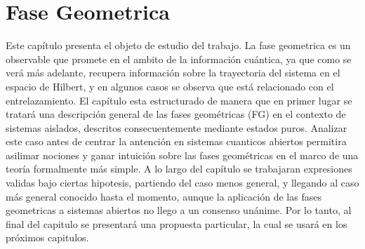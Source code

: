 \chapter{Fase Geometrica}
\label{ch:fg}

\pagestyle{fancy}
\fancyhf{}
\fancyhead[LE]{\nouppercase{\rightmark\hfill}}
\fancyhead[RO]{\nouppercase{\leftmark\hfill}}
\fancyfoot[LE,RO]{\hfill\thepage\hfill}

Este cap\'itulo presenta el objeto de estudio del trabajo. La fase geometrica es un observable que promete en el ambito de la informaci\'on cu\'antica, ya que como se ver\'a m\'as adelante, recupera informaci\'on sobre la trayectoria del sistema en el espacio de Hilbert, y en algunos casos se observa que est\'a relacionado con el entrelazamiento. 
El cap\'itulo esta estructurado de manera que en primer lugar se tratar\'a una descripción general de las fases geom\'etricas (FG) en el contexto de sistemas aislados, descritos consecuentemente mediante estados puros. Analizar este caso antes de centrar la antención en sistemas cuanticos abiertos permitira asilimar nociones y ganar intuición sobre las fases geométricas en el marco de una teoría formalmente más simple. A lo largo del capítulo se trabajaran expresiones validas bajo ciertas hipotesis, partiendo del caso menos general, y llegando al caso más general conocido hasta el momento, aunque la aplicación de las fases geometricas a sistemas abiertos no llego a un consenso unánime. Por lo tanto, al final del capitulo se presentará una propuesta particular, la cual se usará en los próximos capitulos.


